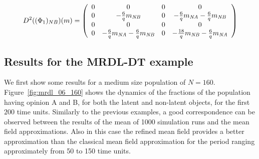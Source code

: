 \documentclass{elsarticle}
\begin{document}
  $$D^2((\Phi_1)_{NB})(m)
= \left(
    \begin{array}{cccc}
      0 &  0& 0 & 0  \\
      0 & -\frac{6}{q}m_{\mathit{NB}} & 0 & -\frac{6}{q}m_{\mathit{NA}}-\frac{6}{q}m_{\mathit{NB}} \\
      0 & 0 & 0 & 0 \\
      0 & -\frac{6}{q}m_{\mathit{NA}}-\frac{6}{q}m_{\mathit{NB}} & 0 & -\frac{18}{q}m_{\mathit{NB}}-\frac{6}{q}m_{\mathit{NA}} \\
    \end{array}
  \right)$$
  
\subsection{Results for the MRDL-DT example}


We first show some results for a medium size population of $N=160$. Figure~\ref{fig:mrdl_06_160} shows the dynamics of the fractions of the population having opinion A and B, for both the latent and non-latent objects,
for the first $200$ time units. Similarly to the previous examples, a good correspondence can be observed between the results of the mean of 1000 simulation runs and the mean field approximations. Also in this case the refined mean field provides a better approximation than the classical mean field approximation for the period ranging approximately from 50 to 150 time units. 
\end{document}
